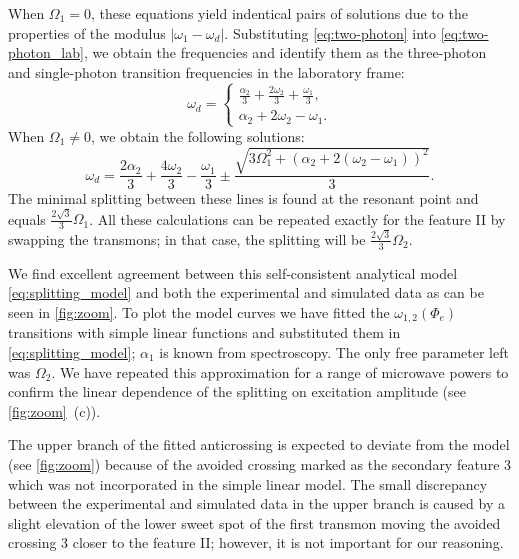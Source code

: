 \documentclass[%
 aps, prx,
 amsmath,amssymb,
 reprint,%
superscriptaddress
]{revtex4-2}
\begin{document}
When $\Omega_1 = 0$, these equations yield indentical pairs of solutions due to the properties of the modulus $|\omega_1 - \omega_d|$. Substituting \autoref{eq:two-photon} into \autoref{eq:two-photon_lab}, we obtain the frequencies and identify them as the three-photon and single-photon transition frequencies in the laboratory frame:
\begin{equation}
\omega_d = \begin{cases} \frac{\alpha_2}{3} + \frac{2 \omega_{2}}{3} + \frac{\omega_{1}}{3}, \\ \alpha_2 + 2 \omega_{2} - \omega_{1}.\end{cases}
\end{equation}
When $\Omega_1 \neq 0$, we obtain the following solutions:
\begin{equation}
\omega_d = \frac{2 \alpha_2}{3} + \frac{4 \omega_{2}}{3} - \frac{\omega_{1}}{3} \pm \frac{\sqrt{3 \Omega_{1}^{2} + \left( \alpha_2 + 2 (\omega_{2} - \omega_{1})\right)^{2}}}{3}.
\label{eq:splitting_model}
\end{equation}
The minimal splitting between these lines is 
found at the resonant point and equals $\frac{2 
\sqrt{3}}{{3}} \Omega_1$. All these calculations 
can be repeated exactly for the feature II by 
swapping the transmons; in that case, the 
splitting will be $\frac{2 \sqrt{3}}{{3}} 
\Omega_2$.

We find excellent agreement between this self-consistent analytical model \autoref{eq:splitting_model} and 
both the experimental and simulated data as can 
be seen in \autoref{fig:zoom}. To plot the model 
curves we have fitted the 
$\omega_{1,2}(\Phi_e)$ transitions with simple 
linear functions and substituted them in 
\autoref{eq:splitting_model}; $\alpha_1$ is known 
from spectroscopy. The only free parameter left 
was $\Omega_2$. We have repeated this 
approximation for a range of microwave powers to 
confirm the linear dependence of the splitting on 
excitation amplitude (see \autoref{fig:zoom}~(c)).

The upper branch of the fitted anticrossing is expected to deviate from the model (see \autoref{fig:zoom}) because of the avoided crossing marked as the secondary feature 3 which was not incorporated in the simple linear model. The small discrepancy between the experimental and simulated data in the upper branch is caused by a slight elevation of the lower sweet spot of the first transmon moving the avoided crossing 3 closer to the feature II; however, it is not important for our reasoning.	
\end{document}
